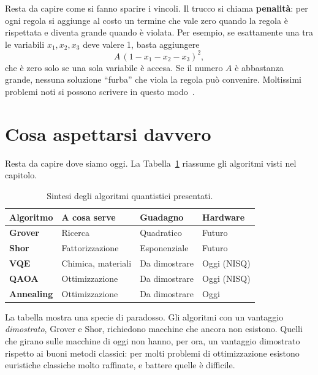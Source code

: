 Resta da capire come si fanno sparire i vincoli. Il trucco si chiama
\textbf{penalità}: per ogni regola si aggiunge al costo un termine che vale zero
quando la regola è rispettata e diventa grande quando è violata. Per esempio,
se esattamente una tra le variabili $x_1, x_2, x_3$ deve valere 1, basta
aggiungere
\begin{equation}
  A\,(1 - x_1 - x_2 - x_3)^2 ,
  \label{eq:penalita}
\end{equation}
che è zero solo se una sola variabile è accesa. Se il numero $A$ è abbastanza
grande, nessuna soluzione ``furba'' che viola la regola può convenire.
Moltissimi problemi noti si possono scrivere in questo modo~\cite{lucas2014ising}.

\section{Cosa aspettarsi davvero}
\label{sec:alg-realismo}

Resta da capire dove siamo oggi. La
Tabella~\ref{tab:alg-sintesi} riassume gli algoritmi visti nel capitolo.

\begin{table}[ht]
  \centering
  \renewcommand{\arraystretch}{1.3}
  \caption{Sintesi degli algoritmi quantistici presentati.}
  \label{tab:alg-sintesi}
  \begin{tabularx}{\textwidth}{>{\bfseries}lXXl}
    \toprule
    Algoritmo & A cosa serve & Guadagno & Hardware \\
    \midrule
    Grover    & Ricerca           & Quadratico                  & Futuro \\
    Shor      & Fattorizzazione   & Esponenziale                & Futuro \\
    VQE       & Chimica, materiali & Da dimostrare              & Oggi (NISQ) \\
    QAOA      & Ottimizzazione    & Da dimostrare               & Oggi (NISQ) \\
    Annealing & Ottimizzazione    & Da dimostrare               & Oggi \\
    \bottomrule
  \end{tabularx}
\end{table}

La tabella mostra una specie di paradosso. Gli algoritmi con un vantaggio
\textit{dimostrato}, Grover e Shor, richiedono macchine che ancora non
esistono. Quelli che girano sulle macchine di oggi non hanno, per ora, un
vantaggio dimostrato rispetto ai buoni metodi classici: per molti problemi di
ottimizzazione esistono euristiche classiche molto raffinate, e battere quelle
è difficile.

